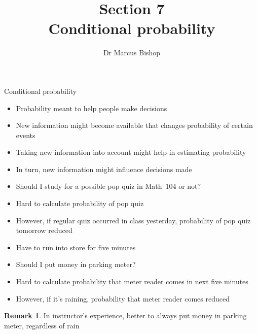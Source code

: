 \documentclass{beamer}
\title[\S7]{Section 7\\Conditional probability}
\author{Dr Marcus Bishop}
\theoremstyle{definition}
\newtheorem{remark}{Remark}
\begin{document}
\begin{frame}\titlepage\end{frame}
\LogoOff

\begin{frame}{Conditional probability}
\begin{itemize}
\item Probability meant to help people make decisions
\item New information might become available
that changes probability of certain events
\item Taking new information into account
might help in estimating probability
\item In turn, new information might influence decisions made
\end{itemize}
\begin{example}
\begin{itemize}
\item Should I study for a possible pop quiz in Math~104 or not?
\item Hard to calculate probability of pop quiz
\item However, if regular quiz occurred in class yesterday,
probability of pop quiz tomorrow reduced
\end{itemize}
\end{example}
\end{frame}

\begin{frame}
\begin{example}
\begin{itemize}
\item Have to run into store for five minutes
\item Should I put money in parking meter?
\item Hard to calculate probability that meter reader
comes in next five minutes
\item However, if it's raining, probability that meter reader
comes reduced
\end{itemize}
\end{example}
\begin{remark}
In instructor's experience, better to always put money
in parking meter, regardless of rain
\end{remark}
\end{frame}
\end{document}
